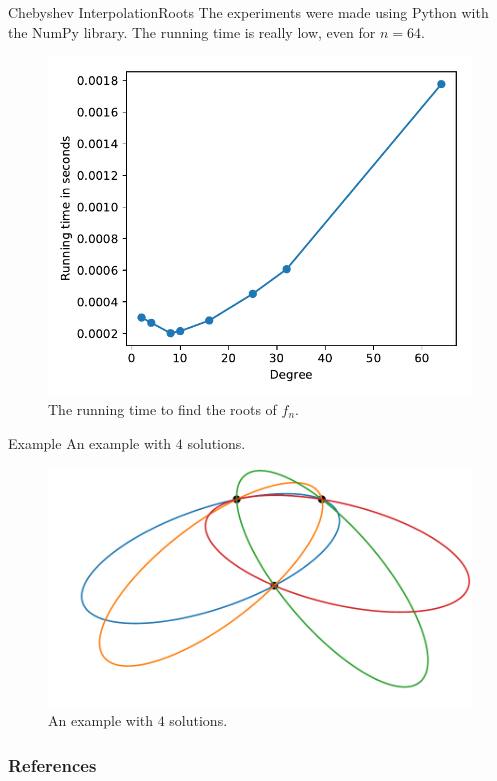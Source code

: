 \documentclass{beamer}
\begin{document}
\begin{frame}{Chebyshev Interpolation}{Roots}
	The experiments were made using Python with the NumPy library. The running time is really low, even for $n=64$.
	\begin{figure}
		\centering
		
		\includegraphics[scale=.6]{running_time}
		\caption{The running time to find the roots of $f_n$.}
	\end{figure}
\end{frame}

\begin{frame}{Example}
	An example with $4$ solutions.
	\begin{figure}
		\centering
		
		\includegraphics[scale=.6]{e3psol012}
		\caption{An example with $4$ solutions.}
	\end{figure}
\end{frame}


\begin{frame}[allowframebreaks]
	\frametitle{References}
	
	
\end{frame}
	
\end{document}

